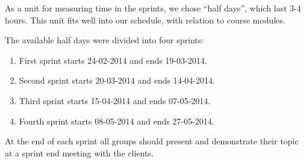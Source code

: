 As a unit for measuring time in the sprints, we chose ``half days'', which last 3-4 hours. This unit fits well into our schedule, with relation to course modules.

The available half days were divided into four sprints:

\begin{enumerate}
\item First sprint starts 24-02-2014 and ends 19-03-2014.
\item Second sprint starts 20-03-2014 and ends 14-04-2014.
\item Third sprint starts 15-04-2014 and ends 07-05-2014.
\item Fourth sprint starts 08-05-2014 and ends 27-05-2014.
\end{enumerate}

At the end of each sprint all groups should present and demonstrate their topic at a sprint end meeting with the clients.
